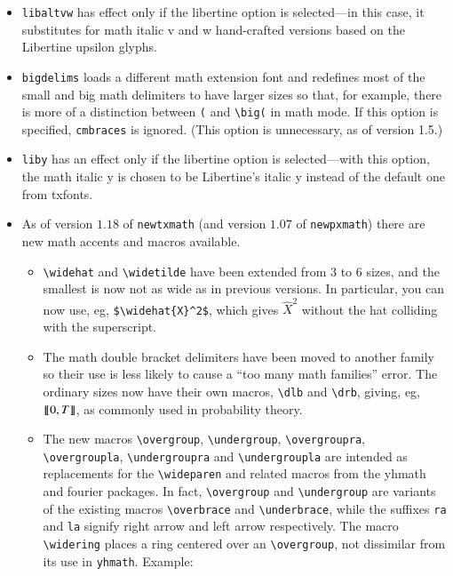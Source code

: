\documentclass[\fsc]{article}
\theoremstyle{oldplain}
\theoremstyle{plain}
\begin{document}
\begin{itemize}
\begin{verbatim}
\def\symAMSb{5}
\documentclass[noamsfonts]{amsart} %or other AMS classes
\let\symAMSb\@undefined
\end{verbatim}
This method of loading the AMS class will save you two slots.
\item {\tt libaltvw} has effect only if the libertine option is selected---in this case, it substitutes for math italic v and w hand-crafted versions based on the Libertine upsilon glyphs.
\item{\tt bigdelims} loads a different math extension font and redefines most of the small and big math delimiters to have larger sizes so that, for example, there is more of a distinction between \verb|(| and \verb|\big(| in math mode. If this option is specified, {\tt cmbraces} is ignored. (This option is unnecessary, as of version 1.5.)
\item{\tt liby} has an effect only if the libertine option is selected---with this option, the math italic y is chosen to be Libertine's italic y instead of the default one from txfonts.
\item As of version $1.18$ of {\tt newtxmath} (and version $1.07$ of {\tt newpxmath}) there are new math accents and macros available.
\begin{itemize}
\item
\verb|\widehat| and \verb|\widetilde| have been extended from $3$ to $6$ sizes, and the smallest is now not as wide as in previous versions. In particular, you can now use, eg, \verb|$\widehat{X}^2$|, which gives $\widehat{X}^2$ without the hat colliding with the superscript.
\item The math double bracket delimiters have been moved to another family so their use is less likely to cause a ``too many math families'' error. The ordinary sizes now have their own macros, \verb|\dlb| and \verb|\drb|, giving, eg, $\llbracket 0,T\rrbracket$, as commonly used in probability theory.
\item The new macros \verb|\overgroup|, \verb|\undergroup|, \verb|\overgroupra|, \verb|\overgroupla|, \verb|\undergroupra| and \verb|\undergroupla| are intended as replacements for the \verb|\wideparen| and related macros from the \textsf{yhmath} and \textsf{fourier} packages. In fact, \verb|\overgroup| and \verb|\undergroup| are variants of the existing macros \verb|\overbrace| and \verb|\underbrace|, while the suffixes {\tt ra} and {\tt la} signify right arrow and left arrow respectively. The macro \verb|\widering| places a ring centered over an \verb|\overgroup|, not dissimilar from its use in {\tt yhmath}. Example:

\end{itemize}
\end{itemize}
\end{document}
